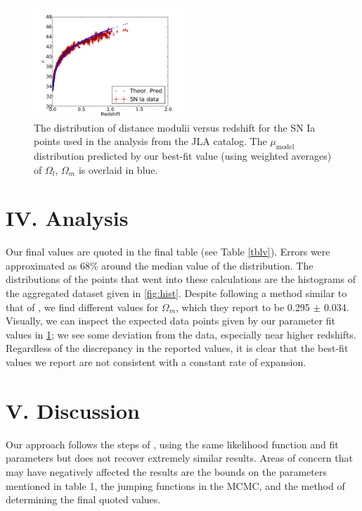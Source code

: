\documentclass[aps,prl,reprint]{revtex4-1}
\begin{document}
\begin{figure}
 \includegraphics[width=0.5\textwidth]{../plots/mu.pdf}
\caption{\label{fig:mu}The distribution of distance modulii versus redshift for the SN Ia points used in the analysis from the JLA catalog. The $\mu_\text{model}$ distribution predicted by our best-fit value (using weighted averages) of $\Omega_l$, $\Omega_m$ is overlaid in blue.}
\end{figure}

\section{IV. Analysis} 
Our final values are quoted in the final table (see Table \ref{tblv}). Errors were approximated as 68\% around the median value of the distribution. The distributions of the points that went into these calculations are the histograms of the aggregated dataset given in \cref{fig:hist}.
Despite following a method similar to that of \cite{sdss}, we find different values for $\Omega_m$, which they report to be 0.295 $\pm$ 0.034. Visually, we can inspect the expected data points given by our parameter fit values in \cref{fig:mu}; we see some deviation from the data, especially near higher redshifts. Regardless of the discrepancy in the reported values, it is clear that the best-fit values we report are not consistent with a constant rate of expansion.
\section{V. Discussion}
Our approach follows the steps of \cite{sdss}, using the same likelihood function and fit parameters but does not recover extremely similar results. Areas of concern that may have negatively affected the results are the bounds on the parameters mentioned in table 1, the jumping functions in the MCMC, and the method of determining the final quoted values.
\end{document}
